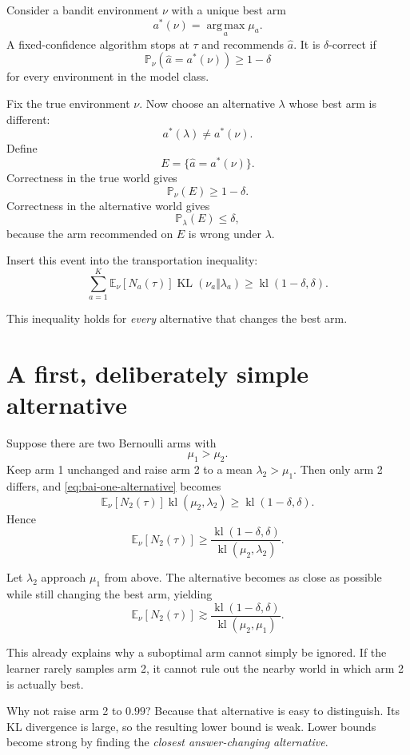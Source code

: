 \documentclass[en,nofont,11pt]{elegantbook}
\newcommand{\E}{\mathbb{E}}
\newcommand{\Pbb}{\mathbb{P}}
\newcommand{\KL}{\operatorname{KL}}
\newcommand{\kl}{\operatorname{kl}}
\newcommand{\argmax}{\operatorname*{arg\,max}}
\begin{document}
Consider a bandit environment $\nu$ with a unique best arm
\[
a^*(\nu)=\argmax_a \mu_a.
\]
A fixed-confidence algorithm stops at $\tau$ and recommends $\widehat a$. It is $\delta$-correct if
\[
\Pbb_\nu(\widehat a=a^*(\nu))\geq1-\delta
\]
for every environment in the model class.

Fix the true environment $\nu$. Now choose an alternative $\lambda$ whose best arm is different:
\[
a^*(\lambda)\neq a^*(\nu).
\]
Define
\[
E=\{\widehat a=a^*(\nu)\}.
\]
Correctness in the true world gives
\[
\Pbb_\nu(E)\geq1-\delta.
\]
Correctness in the alternative world gives
\[
\Pbb_\lambda(E)\leq\delta,
\]
because the arm recommended on $E$ is wrong under $\lambda$.

Insert this event into the transportation inequality:
\begin{equation}
\boxed{
\sum_{a=1}^{K}
\E_\nu[N_a(\tau)]\KL(\nu_a\Vert\lambda_a)
\geq
\kl(1-\delta,\delta).
}
\label{eq:bai-one-alternative}
\end{equation}

This inequality holds for \emph{every} alternative that changes the best arm.

\section{A first, deliberately simple alternative}

Suppose there are two Bernoulli arms with
\[
\mu_1>\mu_2.
\]
Keep arm 1 unchanged and raise arm 2 to a mean $\lambda_2>\mu_1$. Then only arm 2 differs, and \eqref{eq:bai-one-alternative} becomes
\[
\E_\nu[N_2(\tau)]\kl(\mu_2,\lambda_2)
\geq
\kl(1-\delta,\delta).
\]
Hence
\begin{equation}
\E_\nu[N_2(\tau)]
\geq
\frac{\kl(1-\delta,\delta)}{\kl(\mu_2,\lambda_2)}.
\label{eq:single-arm-bai-bound}
\end{equation}

Let $\lambda_2$ approach $\mu_1$ from above. The alternative becomes as close as possible while still changing the best arm, yielding
\[
\E_\nu[N_2(\tau)]
\gtrsim
\frac{\kl(1-\delta,\delta)}{\kl(\mu_2,\mu_1)}.
\]

This already explains why a suboptimal arm cannot simply be ignored. If the learner rarely samples arm 2, it cannot rule out the nearby world in which arm 2 is actually best.

\begin{thinkbox}
Why not raise arm 2 to $0.99$? Because that alternative is easy to distinguish. Its KL divergence is large, so the resulting lower bound is weak. Lower bounds become strong by finding the \emph{closest answer-changing alternative}.
\end{thinkbox}
\end{document}
